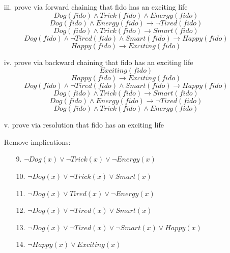 \documentclass[11pt]{article}
\begin{document}
\begin{flushleft}
\begin{enumerate}
\begin{enumerate}
            \item[iii.] prove via forward chaining that fido has an exciting life
                $$ Dog(fido) \wedge Trick(fido) \wedge Energy(fido) $$
                $$ Dog(fido) \wedge Energy(fido) \rightarrow \neg Tired(fido) $$
                $$ Dog(fido) \wedge Trick(fido) \rightarrow Smart(fido) $$
                $$ Dog(fido) \wedge \neg Tired(fido) \wedge Smart(fido) \rightarrow
                    Happy(fido) $$
                $$ Happy(fido) \rightarrow Exciting(fido) $$

            \item[iv.] prove via backward chaining that fido has an exciting life
                $$ Exciting(fido) $$
                $$ Happy(fido) \rightarrow Exciting(fido) $$
                $$ Dog(fido) \wedge \neg Tired(fido) \wedge Smart(fido) \rightarrow
                    Happy(fido) $$
                $$ Dog(fido) \wedge Trick(fido) \rightarrow Smart(fido) $$
                $$ Dog(fido) \wedge Energy(fido) \rightarrow \neg Tired(fido) $$
                $$ Dog(fido) \wedge Trick(fido) \wedge Energy(fido) $$

            \item[v.] prove via resolution that fido has an exciting life\par
                Remove implications:
                \begin{center}
                    \begin{minipage}{0.4\textwidth}
                        \begin{enumerate}
                            \item[9.] $\neg Dog(x) \vee \neg Trick(x) \vee \neg
                                Energy(x)$
                            \item[10.] $\neg Dog(x) \vee \neg Trick(x) \vee
                                Smart(x)$
                            \item[11.] $\neg Dog(x) \vee Tired(x) \vee \neg
                                Energy(x)$
                            \item[12.] $\neg Dog(x) \vee \neg Tired(x) \vee
                                Smart(x)$
                            \item[13.] $\neg Dog(x) \vee \neg Tired(x) \vee
                                \neg Smart(x) \vee Happy(x)$
                            \item[14.] $\neg Happy(x) \vee Exciting(x)$
                        \end{enumerate}
                    \end{minipage}
                \end{center}
        \end{enumerate}


\end{enumerate}
\end{flushleft}
\end{document}
